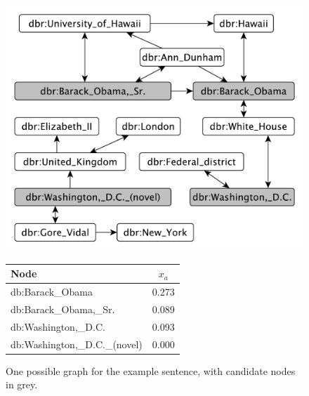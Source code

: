 \documentclass{llncs}
\begin{document}
\begin{figure}[htbp]
	\begin{minipage}[b]{0.57\textwidth} 
         \centering
        \includegraphics[width=\linewidth]{fig/exampleGraph.pdf}
        \caption{One possible graph for the example sentence, with candidate nodes in grey.}
        \label{fig:example}
    \end{minipage}
	\hfill
	\begin{minipage}[b]{0.42\textwidth}
        \centering
        \begin{tabular}{lc}
            \toprule
            \textbf{Node}  & \textbf{$x_a$} \\
            \midrule
            db:Barack\_Obama & 0.273 \\
            db:Barack\_Obama,\_Sr. & 0.089 \\
            db:Washington,\_D.C. & 0.093 \\
            db:Washington,\_D.C.\_(novel) & 0.000 \\
            \bottomrule
        \end{tabular}
        \label{tab:example}
        \vspace{1.8cm}
	\end{minipage}
\end{figure}
\end{document}
